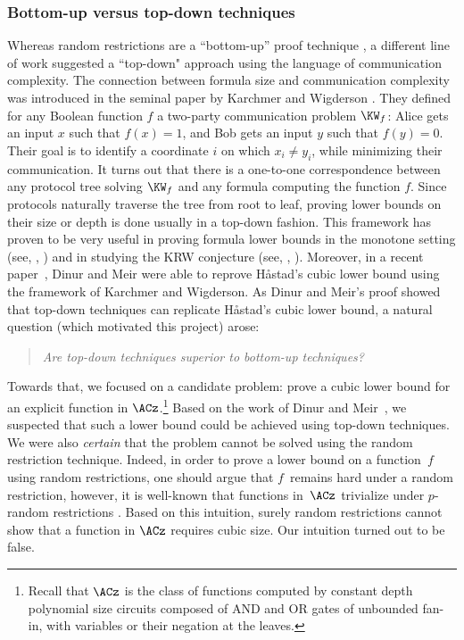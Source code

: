 %
\subsubsection{Bottom-up versus top-down techniques}
%

Whereas random restrictions are a ``bottom-up'' proof technique
\cite{HJP95}, a different line of work suggested a ``top-down"
approach using the language of communication complexity. The connection
between formula size and communication complexity was introduced in
the seminal %
paper by %
Karchmer and Wigderson \cite{KW90}. They defined
for any Boolean function $f$ a two-party communication problem $\KW_{f}$:
Alice gets an input $x$ such that $f(x)=1$, and Bob gets an input
$y$ such that $f(y)=0$. Their goal is to identify a coordinate $i$
on which $x_{i}\neq y_{i}$, while minimizing their communication.
It turns out that there is a one-to-one correspondence between any
protocol tree solving $\KW_{f}$ and any formula computing the function
$f$. Since protocols naturally traverse the tree from root to leaf,
proving lower bounds on their size or depth is done usually in a top-down
fashion. This framework has proven to be very useful in proving formula
lower bounds in the monotone setting (see, \eg, \cite{KW90,GH92,RW92,KRW95,RM99,GP18,PR17})
and in studying the KRW conjecture (see, \eg, \cite{KRW95,EIRS01,HW93,GMWW17,DM18,KM18,M20,RMNPR20,MS21}).
Moreover,
%
in a recent paper~\cite{DM18}, Dinur and Meir were able to %
reprove H{\aa}stad's cubic lower bound using the framework of Karchmer
and Wigderson. As Dinur and Meir's proof showed that top-down techniques
can replicate H{\aa}stad's cubic lower bound, a natural question
(which motivated this project) arose: 
\begin{quote}
\emph{Are top-down techniques superior to bottom-up techniques?} 
\end{quote}
Towards that, we focused on a candidate problem: prove a cubic lower
bound for an explicit function in $\ACz$.\footnote{Recall that $\ACz$ is the class of functions computed by constant
depth polynomial size circuits composed of AND and OR gates of unbounded
fan-in, with variables or their negation at the leaves.} Based on the 
work of Dinur and Meir~\cite{DM18}, we suspected that
such a lower bound could be achieved using top-down techniques. We
were also \emph{certain} that the problem cannot be solved using the
random restriction technique. Indeed, in order to prove a lower bound
on a function~$f$ using random restrictions, one should argue that
$f$~remains hard under a random restriction, however, it is well-known
that functions in~$\ACz$ trivialize under $p$-random restrictions
\cite{A83,FSS84,Y85,H86}. Based on this intuition, surely random
restrictions cannot show that a function in $\ACz$ requires cubic
size. Our intuition turned out to be false.

